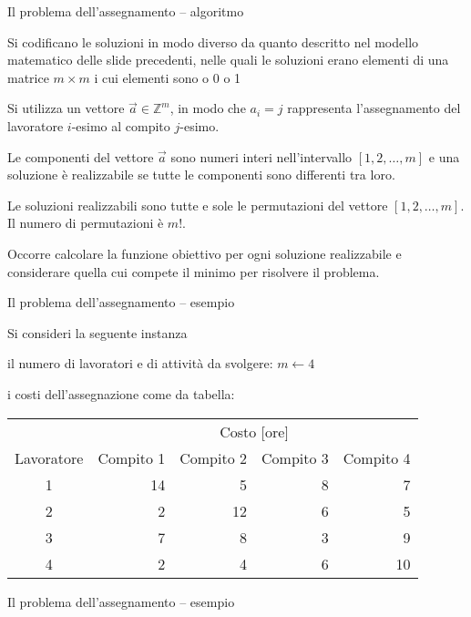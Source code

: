 \documentclass{beamer}
\begin{document}
\begin{frame}[allowframebreaks]{Il problema dell'assegnamento -- algoritmo}

Si codificano le soluzioni in modo diverso da quanto
descritto nel modello matematico delle slide precedenti,
nelle quali le soluzioni erano elementi di una matrice
$m\times m$ i cui elementi sono o 0 o 1

Si utilizza un vettore $\vec{a} \in \mathbb{Z}^m$,
in modo che $a_i = j$ rappresenta l'assegnamento
del lavoratore $i$-esimo al compito $j$-esimo.

Le componenti del vettore $\vec{a}$ sono numeri
interi nell'intervallo $[1,2,\ldots,m]$ e una soluzione
\`e realizzabile se tutte le componenti sono
differenti tra loro.

Le soluzioni realizzabili sono tutte e sole le permutazioni
del vettore $[1, 2,\ldots,m]$. Il numero di permutazioni
\`e $m!$.

Occorre calcolare la funzione obiettivo per ogni soluzione
realizzabile e considerare quella cui compete il minimo
per risolvere il problema.

\end{frame}

\begin{frame}{Il problema dell'assegnamento -- esempio}

Si consideri la seguente instanza

il numero di lavoratori e di attivit\`a da svolgere: $m \gets 4$

i costi dell'assegnazione
come da tabella:

\centering\small{
\begin{tabular}{crrrr} \toprule
	& \multicolumn{4}{c}{Costo [ore]}\\
\cmidrule(r){2-5}
Lavoratore & Compito 1 & Compito 2 & Compito 3 & Compito 4\\ \midrule
1 & 14 &   5 & 8 &   7 \\
2 &   2 & 12 & 6 &   5 \\
3 &   7 &   8 & 3 &   9 \\
4 &   2 &   4 & 6 & 10 \\ \bottomrule
\end{tabular}
}

\end{frame}

\begin{frame}{Il problema dell'assegnamento -- esempio}


\end{frame}
\end{document}

